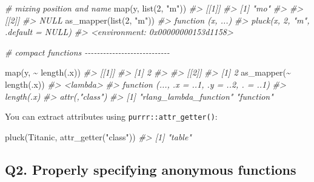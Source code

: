 \documentclass[
]{book}
\newenvironment{Shaded}{\begin{snugshade}}{\end{snugshade}}
\newcommand{\CommentTok}[1]{\textcolor[rgb]{0.56,0.35,0.01}{\textit{#1}}}
\newcommand{\DecValTok}[1]{\textcolor[rgb]{0.00,0.00,0.81}{#1}}
\newcommand{\FunctionTok}[1]{\textcolor[rgb]{0.00,0.00,0.00}{#1}}
\newcommand{\NormalTok}[1]{#1}
\newcommand{\SpecialCharTok}[1]{\textcolor[rgb]{0.00,0.00,0.00}{#1}}
\newcommand{\StringTok}[1]{\textcolor[rgb]{0.31,0.60,0.02}{#1}}
\begin{document}
\begin{Shaded}
\begin{Highlighting}[]
\CommentTok{\# mixing position and name}
\FunctionTok{map}\NormalTok{(y, }\FunctionTok{list}\NormalTok{(}\DecValTok{2}\NormalTok{, }\StringTok{"m"}\NormalTok{))}
\CommentTok{\#\textgreater{} [[1]]}
\CommentTok{\#\textgreater{} [1] "mo"}
\CommentTok{\#\textgreater{} }
\CommentTok{\#\textgreater{} [[2]]}
\CommentTok{\#\textgreater{} NULL}
\FunctionTok{as\_mapper}\NormalTok{(}\FunctionTok{list}\NormalTok{(}\DecValTok{2}\NormalTok{, }\StringTok{"m"}\NormalTok{))}
\CommentTok{\#\textgreater{} function (x, ...) }
\CommentTok{\#\textgreater{} pluck(x, 2, "m", .default = NULL)}
\CommentTok{\#\textgreater{} \textless{}environment: 0x00000000153d1158\textgreater{}}

\CommentTok{\# compact functions {-}{-}{-}{-}{-}{-}{-}{-}{-}{-}{-}{-}{-}{-}{-}{-}{-}{-}{-}{-}{-}{-}{-}{-}{-}{-}{-}{-}}

\FunctionTok{map}\NormalTok{(y, }\SpecialCharTok{\textasciitilde{}} \FunctionTok{length}\NormalTok{(.x))}
\CommentTok{\#\textgreater{} [[1]]}
\CommentTok{\#\textgreater{} [1] 2}
\CommentTok{\#\textgreater{} }
\CommentTok{\#\textgreater{} [[2]]}
\CommentTok{\#\textgreater{} [1] 2}
\FunctionTok{as\_mapper}\NormalTok{(}\SpecialCharTok{\textasciitilde{}} \FunctionTok{length}\NormalTok{(.x))}
\CommentTok{\#\textgreater{} \textless{}lambda\textgreater{}}
\CommentTok{\#\textgreater{} function (..., .x = ..1, .y = ..2, . = ..1) }
\CommentTok{\#\textgreater{} length(.x)}
\CommentTok{\#\textgreater{} attr(,"class")}
\CommentTok{\#\textgreater{} [1] "rlang\_lambda\_function" "function"}
\end{Highlighting}
\end{Shaded}

You can extract attributes using \texttt{purrr::attr\_getter()}:

\begin{Shaded}
\begin{Highlighting}[]
\FunctionTok{pluck}\NormalTok{(Titanic, }\FunctionTok{attr\_getter}\NormalTok{(}\StringTok{"class"}\NormalTok{))}
\CommentTok{\#\textgreater{} [1] "table"}
\end{Highlighting}
\end{Shaded}

\hypertarget{q2.-properly-specifying-anonymous-functions}{%
\subsection*{Q2. Properly specifying anonymous functions}\label{q2.-properly-specifying-anonymous-functions}}
\end{document}
